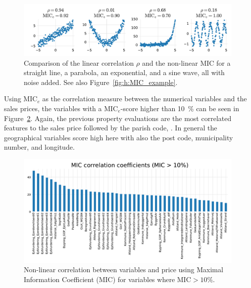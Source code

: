 \begin{figure}
  \centerfloat
  \includegraphics[width=0.99\textwidth, trim=10 10 10 10, clip]{figures/housing/MIC_test_small.pdf}
  \caption[Comparison of the Linear Correlation $\rho$ and the Non-Linear MIC.]
          {Comparison of the linear correlation $\rho$ and the non-linear MIC for a straight line, a parabola, an exponential, and a sine wave, all with noise added. See also Figure~\ref{fig:h:MIC_example}.}
  \label{fig:h:MIC_example_small}
\end{figure}

Using $\mathrm{MIC}_e$ as the correlation measure between the numerical variables and the sales prices, the variables with a $\mathrm{MIC}_e$-score higher than \SI{10}{\percent} can be seen in Figure~\ref{fig:h:corr_MIC}. Again, the previous property evaluations are the most correlated features to the sales price followed by the parish code, . In general the geographical variables score high here with also the post code, municipality number, and longitude. 

\begin{figure}
  \centerfloat
  \includegraphics[width=0.99\textwidth, trim=10 10 0 40, clip]{figures/housing/MIC_plot.pdf}
  \caption[Non-linear correlation between variables and price]
          {Non-linear correlation between variables and price using Maximal Information Coefficient (MIC) for variables where $\text{MIC}>10\%$.}
  \label{fig:h:corr_MIC}
\end{figure}

